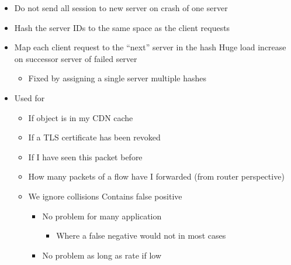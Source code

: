 \begin{itemize}
\begin{itemize}
\begin{itemize}
                \end{itemize}
                \begin{itemize}
                    \item Do not send all session to new server on crash of one server
                    \item Hash the server IDs to the same space as the client requests
                    \item Map each client request to the ``next'' server in the hash
                    \icon Huge load increase on successor server of failed server
                        \begin{itemize}
                            \item Fixed by assigning a single server multiple hashes
                        \end{itemize}
                \end{itemize}
        \end{itemize}
        \begin{itemize}
            \item Used for
                \begin{itemize}
                    \item If object is in my CDN cache
                    \item If a TLS certificate has been revoked
                    \item If I have seen this packet before
                    \item How many packets of a flow have I forwarded (from router perspective)
                \end{itemize}
                \begin{itemize}
                    \item We ignore collisions
                    \icon Contains false positive
                        \begin{itemize}
                            \item No problem for many application
                                \begin{itemize}
                                    \item Where a false negative would not in most cases
                                \end{itemize}
                            \item No problem as long as rate if low

\end{itemize}
\end{itemize}
\end{itemize}
\end{itemize}
